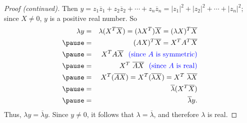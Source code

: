\documentclass[pdf
]{beamer}
\begin{document}
{{\begin{proof}[Proof (continued)]
\pause
Then
$y= z_1 \overline{z}_1 + z_2 \overline{z}_2 + \cdots +
z_n \overline{z}_n
= |z_1|^2 + |z_2|^2 + \cdots + |z_n|^2$;\\ \pause 
since $X\neq 0$,
$y$ is a positive real number.
So
\begin{eqnarray*}
\lambda y & = & \lambda(X^T\overline{X}) 
=(\lambda X^T)\overline{X} 
=(\lambda X)^T\overline{X} \\ \pause 
& = & (AX)^T\overline{X} 
= X^T A^T \overline{X} \\  \pause 
& = &X^T A \overline{X}~~
\mbox{\textcolor{blue}{ (since $A$ is symmetric)}} \\  \pause 
& = & X^T ~\overline{A} \overline{X}~~
\mbox{\textcolor{blue}{ (since $A$ is real)}} \\  \pause 
& = & X^T (\overline{AX})
= X^T (\overline{\lambda X})
= X^T ~\overline{\lambda}\overline{X} \\  \pause 
& = & \overline{\lambda} (X^T \overline{X}) \\  \pause 
& = & \overline{\lambda} y.
\end{eqnarray*}  \pause 
Thus, $\lambda y= \overline{\lambda} y$.
Since $y\neq 0$, it follows that
$\lambda = \overline{\lambda}$, and therefore $\lambda$ is real. 
\end{proof}
}


}
\end{document}
